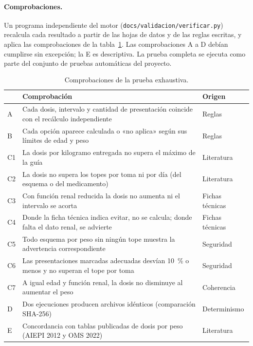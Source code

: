 \documentclass[11pt,a4paper]{article}
\newcommand{\codigo}[1]{\texttt{\small #1}}
\begin{document}
\paragraph{Comprobaciones.} Un programa independiente del motor (\codigo{docs/validacion/verificar.py}) recalcula cada resultado a partir de las hojas de datos y de las reglas escritas, y aplica las comprobaciones de la tabla~\ref{tab:comprobaciones}. Las comprobaciones A a D debían cumplirse sin excepción; la E es descriptiva. La prueba completa se ejecuta como parte del conjunto de pruebas automáticas del proyecto.

\begin{table}[htbp]
\centering
\caption{Comprobaciones de la prueba exhaustiva.}
\label{tab:comprobaciones}
\small
\begin{tabularx}{\textwidth}{@{}lXl@{}}
\toprule
& Comprobación & Origen \\
\midrule
A & Cada dosis, intervalo y cantidad de presentación coincide con el recálculo independiente & Reglas \\
B & Cada opción aparece calculada o «no aplica» según sus límites de edad y peso & Reglas \\
C1 & La dosis por kilogramo entregada no supera el máximo de la guía & Literatura \\
C2 & La dosis no supera los topes por toma ni por día (del esquema o del medicamento) & Literatura \\
C3 & Con función renal reducida la dosis no aumenta ni el intervalo se acorta & Fichas técnicas \\
C4 & Donde la ficha técnica indica evitar, no se calcula; donde falta el dato renal, se advierte & Fichas técnicas \\
C5 & Todo esquema por peso sin ningún tope muestra la advertencia correspondiente & Seguridad \\
C6 & Las presentaciones marcadas adecuadas desvían 10~\% o menos y no superan el tope por toma & Seguridad \\
C7 & A igual edad y función renal, la dosis no disminuye al aumentar el peso & Coherencia \\
D & Dos ejecuciones producen archivos idénticos (comparación SHA-256) & Determinismo \\
E & Concordancia con tablas publicadas de dosis por peso (AIEPI 2012 y OMS 2022) & Literatura \\
\bottomrule
\end{tabularx}
\end{table}
\end{document}
